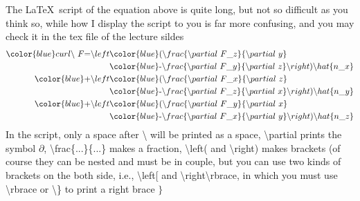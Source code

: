 \documentclass{beamer}
\begin{document}
\begin{frame}
	The \LaTeX\ script of the equation above is quite long, but not so difficult as you think so, while how I display the script to you is far more confusing, and you may check it in the tex file of the lecture sildes
	\begin{align*}
	\color{blue} curl\backslash\ F
	\text{=}\backslash left & \color{blue} (\backslash frac\{\backslash partial\ F\_z\}\{\backslash partial\ y\}\\
	& \color{blue} \text{-}\backslash frac\{\backslash partial\ F\_y\}\{\backslash partial\ z\}\backslash right)\backslash hat\{n\_x\}\\
	\color{blue} \text{+}\backslash left & \color{blue} (\backslash frac\{\backslash partial\ F\_x\}\{\backslash partial\ z\}\\
	& \color{blue} \text{-}\backslash frac\{\backslash partial\ F\_z\}\{\backslash partial\ x\}\backslash right)\backslash hat\{n\_y\}\\
	\color{blue} \text{+}\backslash left & \color{blue} (\backslash frac\{\backslash partial\ F\_y\}\{\backslash partial\ x\}\\
	& \color{blue} \text{-}\backslash frac\{\backslash partial\ F\_x\}\{\backslash partial\ y\}\backslash right)\backslash hat\{n\_z\}
	\end{align*}
	In the script, only a space after {\color{blue}\textbackslash} will be printed as a space, {\color{blue}\textbackslash partial} prints the symbol {\color{blue}$\partial$}, {\color{blue}\textbackslash frac\{...\}\{...\}} makes a {\color{blue}fraction}, {\color{blue}\textbackslash left(} and {\color{blue}\textbackslash right)} makes {\color{blue}brackets} (of course they can be nested and must be in couple, but you can use two kinds of brackets on the both side, i.e., {\color{blue}\textbackslash left[} and {\color{blue}\textbackslash right\textbackslash rbrace}, in which you must use {\color{blue}\textbackslash rbrace} or {\color{blue}\textbackslash \}} to print a right brace {\color{blue}$\rbrace$} \\
\end{frame}
\end{document}
